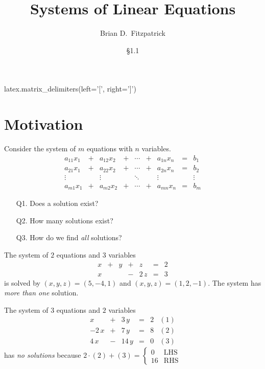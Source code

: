 \documentclass[12pt]{article}
\begin{document}
\title{Systems of Linear Equations}
\author{Brian D.\ Fitzpatrick}
\date{\S1.1}

\maketitle


\begin{sagesilent}
  latex.matrix_delimiters(left='[', right=']')
\end{sagesilent}

\section{Motivation}

Consider the system of $m$ equations with $n$ variables.
\begin{equation}\label{eq:motivation}
  \begin{array}{rcrcccrcr}
    a_{11}x_1 & + & a_{12}x_2 & + & \dotsb & + & a_{1n}x_n & = & b_1    \\
    a_{21}x_1 & + & a_{22}x_2 & + & \dotsb & + & a_{2n}x_n & = & b_2    \\
    \vdots    &   & \vdots    &   & \ddots &   & \vdots    &   & \vdots \\
    a_{m1}x_1 & + & a_{m2}x_2 & + & \dotsb & + & a_{mn}x_n & = & b_m
  \end{array}\tag{$\ast$}
\end{equation}
\begin{itemize}
\item[Q1.] Does a solution exist?
\item[Q2.] How many solutions exist?
\item[Q3.] How do we find \emph{all} solutions?
\end{itemize}

\begin{ex}
  The system of $2$ equations and $3$ variables
  \[
  \begin{array}{rcrcrcr}
    x & + & y & + & z    & = & 2  \\
    x &   &   & - & 2\,z & = & 3
  \end{array}
  \]
  is solved by $(x,y,z)=(5,-4,1)$ and $(x,y,z)=(1,2,-1)$. The system has
  \emph{more than one} solution.
\end{ex}

\begin{ex}
  The system of $3$ equations and $2$ variables
  \[
  \begin{array}{rcrcrr}
    x     & + & 3\,y  & = & 2 & (1)\\
    -2\,x & + & 7\,y  & = & 8 & (2)\\
    4\,x  & - & 14\,y & = & 0 & (3)
  \end{array}
  \]
  has \emph{no solutions} because
  $
  2\cdot(2)+(3)
  =
  \begin{cases}
    0 & \text{LHS} \\
    16 & \text{RHS}
  \end{cases}
  $
\end{ex}
\end{document}

